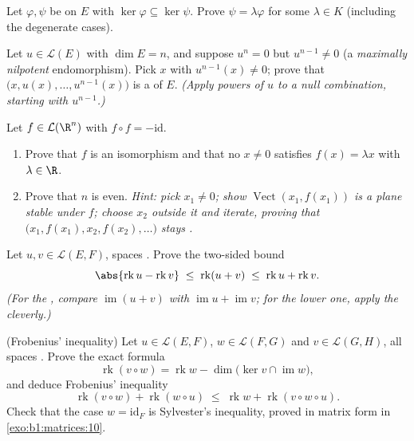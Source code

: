 \begin{exercise}[$\star\star$]\label{exo:b1:linmaps:8}
Let $\varphi, \psi$ be  on $E$ with $\ker\varphi
\subseteq \ker\psi$. Prove $\psi = \lambda\varphi$ for some
$\lambda \in K$ (including the degenerate cases).
\end{exercise}

\begin{exercise}[$\star\star\star$]\label{exo:b1:linmaps:9}
Let $u \in \mathcal{L}(E)$ with $\dim E = n$, and suppose $u^n = 0$
but $u^{n-1} \neq 0$ (a \emph{maximally nilpotent} endomorphism).
Pick $x$ with $u^{n-1}(x) \neq 0$; prove that $\bigl(x, u(x), \dots,
u^{n-1}(x)\bigr)$ is a  of $E$. \emph{(Apply powers of $u$ to a
null combination, starting with $u^{n-1}$.)}
\end{exercise}

\begin{exercise}[$\star\star\star$]\label{exo:b1:linmaps:10}
Let $f \in \mathcal{L}(\R^n)$ with $f \circ f = -\mathrm{id}$.
\begin{enumerate}
  \item Prove that $f$ is an isomorphism and that no $x \neq 0$
        satisfies $f(x) = \lambda x$ with $\lambda \in \R$.
  \item Prove that $n$ is even. \emph{Hint: pick $x_1 \neq 0$; show
        $\operatorname{Vect}(x_1, f(x_1))$ is a plane stable under
        $f$; choose $x_2$ outside it and iterate, proving that
        $\bigl(x_1, f(x_1), x_2, f(x_2), \dots\bigr)$ stays .}
\end{enumerate}
\end{exercise}

\begin{exercise}[$\star\star$]\label{exo:b1:linmaps:11}
Let $u, v \in \mathcal{L}(E, F)$, spaces .
Prove the two-sided bound
\[
\abs{\operatorname{rk} u - \operatorname{rk} v}
\;\leq\; \operatorname{rk}(u + v)
\;\leq\; \operatorname{rk} u + \operatorname{rk} v .
\]
\emph{(For the , compare $\operatorname{im}(u+v)$ with
$\operatorname{im} u + \operatorname{im} v$; for the lower one,
apply the  cleverly.)}
\end{exercise}

\begin{exercise}[$\star\star\star$]\label{exo:b1:linmaps:12}
(Frobenius' inequality) Let $u \in \mathcal{L}(E, F)$, $w \in
\mathcal{L}(F, G)$ and $v \in \mathcal{L}(G, H)$, all spaces
. Prove the exact formula
\[
\operatorname{rk}(v \circ w) = \operatorname{rk} w -
\dim\bigl(\ker v \cap \operatorname{im} w\bigr),
\]
and deduce Frobenius' inequality
\[
\operatorname{rk}(v \circ w) + \operatorname{rk}(w \circ u)
\;\leq\; \operatorname{rk} w + \operatorname{rk}(v \circ w \circ
u) .
\]
Check that the case $w = \mathrm{id}_F$ is Sylvester's
inequality, proved in matrix form in \cref{exo:b1:matrices:10}.
\end{exercise}

